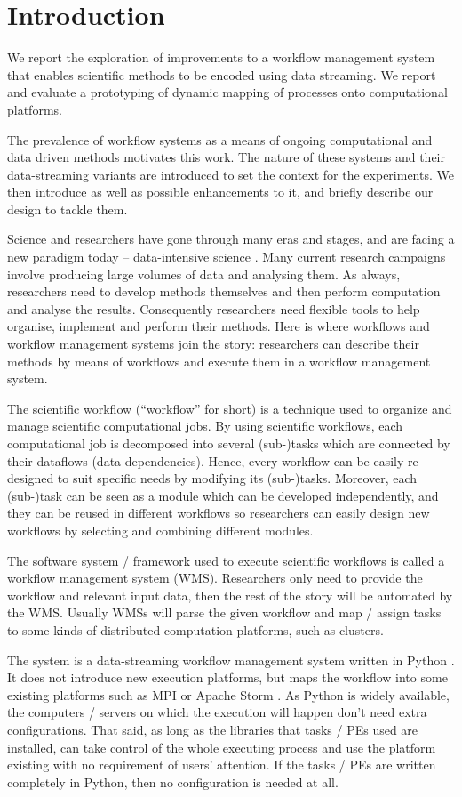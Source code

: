 \chapter{Introduction}
We report the exploration of improvements to a workflow management system that enables scientific methods to be encoded using data streaming. We report and evaluate a prototyping of dynamic mapping of processes onto computational platforms.

The prevalence of workflow systems as a means of ongoing computational and data driven methods motivates this work. The nature of these systems and their data-streaming variants are introduced to set the context for the experiments. We then introduce \dpy as well as possible enhancements to it, and briefly describe our design to tackle them.

Science and researchers have gone through many eras and stages, and are facing a new paradigm today -- data-intensive science \cite{hey2009fourth}. Many current research campaigns involve producing large volumes of data and analysing them. As always, researchers need to develop methods themselves and then perform computation and analyse the results. Consequently researchers need flexible tools to help organise, implement and perform their methods. Here is where workflows and workflow management systems join the story: researchers can describe their methods by means of workflows and execute them in a workflow management system.

The scientific workflow (``workflow'' for short) is a technique used to organize and manage scientific computational jobs. By using scientific workflows, each computational job is decomposed into several (sub-)tasks which are connected by their dataflows (data dependencies). Hence, every workflow can be easily re-designed to suit specific needs by modifying its (sub-)tasks. Moreover, each (sub-)task can be seen as a module which can be developed independently, and they can be reused in different workflows so researchers can easily design new workflows by selecting and combining different modules.

The software system / framework used to execute scientific workflows is called a workflow management system (WMS). Researchers only need to provide the workflow and relevant input data, then the rest of the story will be automated by the WMS. Usually WMSs will parse the given workflow and map / assign tasks to some kinds of distributed computation platforms, such as clusters.

The \dpy system is a data-streaming workflow management system written in Python \cite{doi:10.1177/1094342016649766}. It does not introduce new execution platforms, but maps the workflow into some existing platforms such as MPI \cite{MPI_forum} or Apache Storm \cite{apache_storm}. As Python is widely available, the computers / servers on which the execution will happen don't need extra configurations. That said, as long as the libraries that tasks / PEs used are installed, \dpy can take control of the whole executing process and use the platform existing with no requirement of users' attention. If the tasks / PEs are written completely in Python, then no configuration is needed at all.

